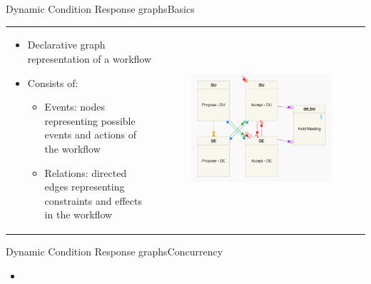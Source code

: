 \documentclass{beamer}
\begin{document}
\begin{frame}{Dynamic Condition Response graphs}{Basics}%
\begin{tabular}{lc}
  \parbox{0.5\linewidth}{\begin{itemize}
		\item Declarative graph representation of a workflow
		\item Consists of:
		\begin{itemize}
			\item Events: nodes representing possible events and actions of the workflow
			\item Relations: directed edges representing constraints and effects in the workflow
		\end{itemize}
	\end{itemize}
	}
	&
  \parbox{0.5\linewidth}{
	\begin{figure}[p]
		\includegraphics[scale=0.08]{figures/example6.png}
	\end{figure}
	}
\end{tabular}
\end{frame}

\begin{frame}{Dynamic Condition Response graphs}{Concurrency}
	\begin{itemize}
  	\item 
  \end{itemize}    
\end{frame}
\end{document}
